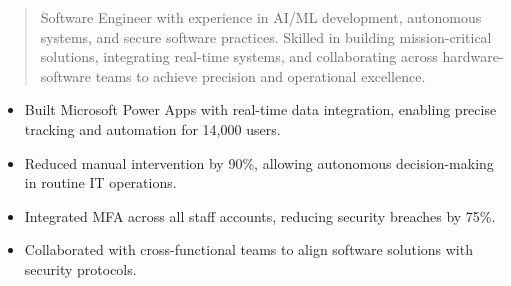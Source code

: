 



\makecvheader

\begin{quote}
  \noindent
  Software Engineer with experience in AI/ML development, autonomous systems, and secure software practices. Skilled in building mission-critical solutions, integrating real-time systems, and collaborating across hardware-software teams to achieve precision and operational excellence.
\end{quote}

\par\smallskip
\noindent
\begin{minipage}{20cm}
  \begin{minipage}{9.75cm}
    \begin{itemize}
      \item Built Microsoft Power Apps with real-time data integration, enabling precise tracking and automation for 14,000 users.
      \item Reduced manual intervention by 90\%, allowing autonomous decision-making in routine IT operations.
    \end{itemize}
  \end{minipage}
  \hfill
  \begin{minipage}{9.75cm}
    \begin{itemize}
      \item Integrated MFA across all staff accounts, reducing security breaches by 75\%.
      \item Collaborated with cross-functional teams to align software solutions with security protocols.
    \end{itemize}
  \end{minipage}
\end{minipage}
\par\smallskip
\divider

